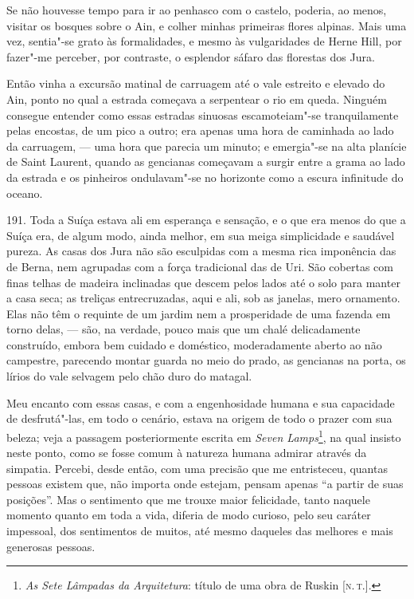 Se não houvesse tempo para ir ao penhasco com o castelo, poderia, ao
menos, visitar os bosques sobre o Ain, e colher minhas primeiras flores
alpinas. Mais uma vez, sentia"-se grato às formalidades, e mesmo às
vulgaridades de Herne Hill, por fazer"-me perceber, por contraste, o
esplendor sáfaro das florestas dos Jura.

Então vinha a excursão matinal de carruagem até o vale estreito e
elevado do Ain, ponto no qual a estrada começava a serpentear o rio em
queda. Ninguém consegue entender como essas estradas sinuosas
escamoteiam"-se tranquilamente pelas encostas, de um pico a outro; era
apenas uma hora de caminhada ao lado da carruagem, --- uma hora que
parecia um minuto; e emergia"-se na alta planície de Saint Laurent,
quando as gencianas começavam a surgir entre a grama ao lado da estrada
e os pinheiros ondulavam"-se no horizonte como a escura infinitude do
oceano.

191. Toda a Suíça estava ali em esperança e sensação, e o que era menos
do que a Suíça era, de algum modo, ainda melhor, em sua meiga
simplicidade e saudável pureza. As casas dos Jura não são esculpidas com
a mesma rica imponência das de Berna, nem agrupadas com a força
tradicional das de Uri. São cobertas com finas telhas de madeira
inclinadas que descem pelos lados até o solo para manter a casa seca; as
treliças entrecruzadas, aqui e ali, sob as janelas, mero ornamento. Elas
não têm o requinte de um jardim nem a prosperidade de uma fazenda em
torno delas, --- são, na verdade, pouco mais que um chalé delicadamente
construído, embora bem cuidado e doméstico, moderadamente aberto ao não
campestre, parecendo montar guarda no meio do prado, as gencianas na
porta, os lírios do vale selvagem pelo chão duro do matagal.

Meu encanto com essas casas, e com a engenhosidade humana e sua
capacidade de desfrutá"-las, em todo o cenário, estava na origem de todo
o prazer com sua beleza; veja a passagem posteriormente escrita em
\emph{Seven Lamps}\footnote{\emph{As Sete Lâmpadas da Arquitetura}:
  título de uma obra de Ruskin {[}\textsc{n.\,t.}{]}.}, na qual insisto neste
ponto, como se fosse comum à natureza humana admirar através da
simpatia. Percebi, desde então, com uma precisão que me entristeceu,
quantas pessoas existem que, não importa onde estejam, pensam apenas ``a
partir de suas posições''. Mas o sentimento que me trouxe maior
felicidade, tanto naquele momento quanto em toda a vida, diferia de modo
curioso, pelo seu caráter impessoal, dos sentimentos de muitos, até
mesmo daqueles das melhores e mais generosas pessoas.


